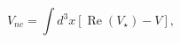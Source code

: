 \begin{equation}
V_{nc}=\int d^{3}x\left[  \operatorname{Re}\left(  V_{\star}\right)
-V\right]  ,\label{6}%
\end{equation}%
